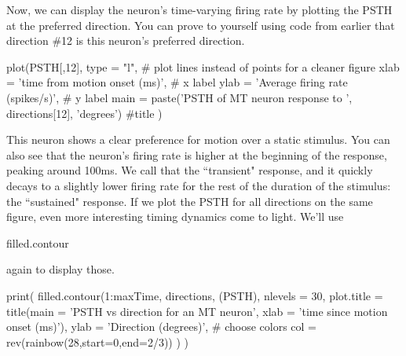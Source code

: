 \documentclass[
letterpaper, %
11pt, %
 oneside, 
onecolumn, %
]{memoir}
\numberwithin{Exercise}{chapter}
\begin{document}
Now, we can display the neuron's time-varying firing rate by plotting the PSTH at the preferred direction. You can prove to yourself using code from earlier that direction \#12 is this neuron's preferred direction.

\begin{shortrcode}

plot(PSTH[,12], 
     type = "l", 			# plot lines instead of points for a cleaner figure
     xlab = 'time from motion onset (ms)', 	# x label
     ylab = 'Average firing rate (spikes/s)',	# y label
     main = paste('PSTH of MT neuron response to ', directions[12], 'degrees') #title
)
\end{shortrcode}

This neuron shows a clear preference for motion over a static stimulus. You can also see that the neuron's firing rate is higher at the beginning of the response, peaking around 100ms.  We call that the ``transient" response, and it quickly decays to a slightly lower firing rate for the rest of the duration of the stimulus: the ``sustained" response. If we plot the PSTH for all directions on the same figure, even more interesting timing dynamics come to light. We'll use \begin{ttfamily}filled.contour\end{ttfamily} again to display those. 

\begin{shortrcode}
print(
  filled.contour(1:maxTime,  directions,  (PSTH), 
    nlevels = 30,    
                    plot.title = title(main = 'PSTH vs direction for an MT neuron',
                     xlab =  'time since motion onset (ms)'),
   	 ylab = 'Direction (degrees)',
    # choose colors
    col = rev(rainbow(28,start=0,end=2/3))
  )
)
\end{shortrcode}
\end{document}
